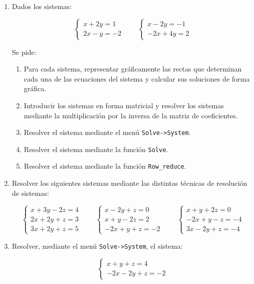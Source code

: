\documentclass[a4paper]{article}
\begin{document}
\begin{enumerate}[leftmargin=*]
\item Dados los sistemas:

\[\left\{
\begin{array}{l}
x+2y=1 \\
2x-y=-2
\end{array}\right.
\qquad
\left\{
\begin{array}{l}
x-2y=-1 \\
-2x+4y=2
\end{array}\right.
\]

Se pide:
\begin{enumerate}
\item Para cada sistema, representar gráficamente las rectas que determinan cada una de las ecuaciones del sistema y calcular sus soluciones de forma gráfica.
\item Introducir los sistemas en forma matricial y resolver los sistemas mediante la multiplicación por la  inversa de la matriz de coeficientes.
\item Resolver el sistema mediante el menú \texttt{Solve->System}.
\item Resolver el sistema mediante la función \texttt{Solve}.
\item Resolver el sistema mediante la función \texttt{Row\_reduce}.
\end{enumerate}

\item Resolver los siguientes sistemas mediante las distintas técnicas de resolución de sistemas:

\[
\left\{
\begin{array}{l}
x+3y-2z=4 \\
2x+2y+z=3 \\
3x+2y+z=5 
\end{array}\right.
\qquad
\left\{
\begin{array}{l}
x-2y+z=0 \\
x+y-2z=2 \\
-2x+y+z=-2 
\end{array}\right.
\qquad
\left\{
\begin{array}{l}
x+y+2z=0 \\
-2x+y-z=-4 \\
3x-2y+z=-4 
\end{array}\right.
\]

\item Resolver, mediante el menú \texttt{Solve->System}, el sistema:

\[
\left\{
\begin{array}{l}
x+y+z=4\\
-2x-2y+z=-2 
\end{array}\right.
\]


\end{enumerate}
\end{document}
